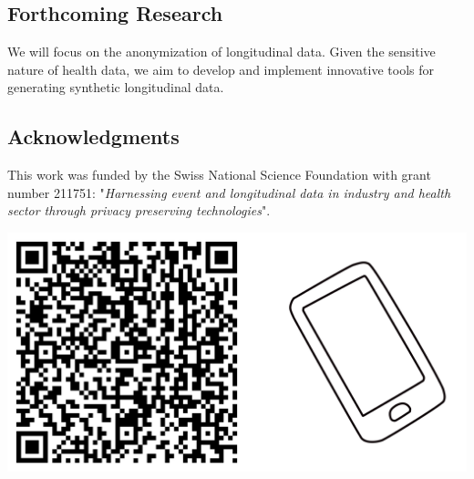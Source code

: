 \documentclass[a0,portrait]{a0poster}
\begin{document}
\begin{multicols}{3}
\section{Forthcoming Research}

We will focus on the anonymization of longitudinal data.
Given the sensitive nature of health data, we aim to develop and implement innovative tools for generating synthetic longitudinal data.

\subsection{Acknowledgments}
\normalsize
This work was funded by the Swiss National Science Foundation with grant number 211751: "\textit{Harnessing event and longitudinal data in industry and health sector through privacy preserving technologies}".

\singlespacing
\small
\nocite{*} %

\includegraphics[width=1\linewidth]{Poster TEX/style/qr-code.png}
 
\end{multicols}
\end{document}
